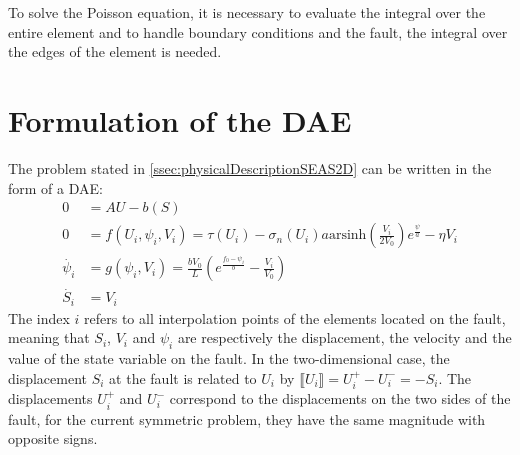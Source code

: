 \documentclass{report}
\begin{document}
To solve the Poisson equation, it is necessary to evaluate the integral over the entire element and to handle boundary conditions and the fault, the integral over the edges of the element is needed. 


\section{Formulation of the DAE}
The problem stated in \autoref{ssec:physicalDescriptionSEAS2D} can be written in the form of a DAE:
\begin{align}
    0 &= AU - b(S) \label{eq:SEASDAE_AU-b(S)}  \\
    0 &= f(U_i,\psi_i,V_i) = \tau(U_i) - \sigma_n(U_i)a\text{arsinh}\left(\frac{V_i}{2V_0}\right)e^{\frac{\psi}{a}} - \eta V_i \label{eq:SEASDAE_frictionLaw}\\
    \dot{\psi_i} &= g(\psi_i, V_i) = \frac{bV_0}{L}\left(e^{\frac{f_0-\psi_i}{b}} - \frac{V_i}{V_0}\right) \label{eq:SEASDAE_dpsi_dt} \\
    \dot{S_i} &= V_i \label{eq:SEASDAE_dV_dt}
\end{align}
The index $i$ refers to all interpolation points of the elements located on the fault, meaning that $S_i$, $V_i$ and $\psi_i$ are respectively the displacement, the velocity and the value of the state variable on the fault. In the two-dimensional case, the displacement $S_i$ at the fault is related to $U_i$ by $\llbracket U_i \rrbracket = U_i^+ - U_i^- = -S_i$. The displacements $U_i^+$ and $U_i^-$ correspond to the displacements on the two sides of the fault, for the current symmetric problem, they have the same magnitude with opposite signs. 
\end{document}
